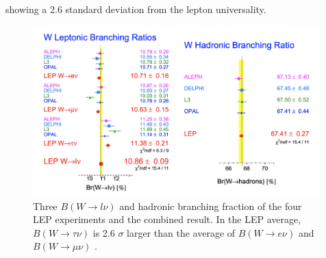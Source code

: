 \noindent showing a 2.6 standard deviation from the lepton universality.


\begin{figure}[ht]
    \centering
    \includegraphics[width=0.99\textwidth]{chapters/RelatedWorks/sectionLU/figures/lepResult.png}
    \caption{Three $B(W\to l \nu)$  and hadronic branching fraction of the four LEP experiments and the combined result. In the LEP average, $B(W\to \tau \nu)$  is 2.6 $\sigma$ larger than the average of $B(W\to e \nu)$ and $B(W\to \mu \nu)$ \cite{Schael:2013ita}. }
    \label{fig:relatedWorks:lu:W:lep}
\end{figure}


